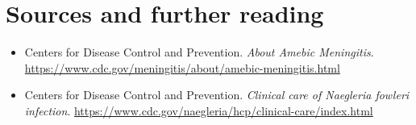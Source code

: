 \section*{Sources and further reading}
\begin{itemize}
\item Centers for Disease Control and Prevention. \textit{About Amebic Meningitis}. \url{https://www.cdc.gov/meningitis/about/amebic-meningitis.html}
\item Centers for Disease Control and Prevention. \textit{Clinical care of Naegleria fowleri infection}. \url{https://www.cdc.gov/naegleria/hcp/clinical-care/index.html}
\end{itemize}
